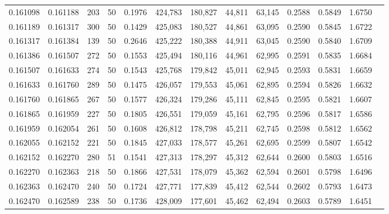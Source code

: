 \begin{tabular}{rrrrrrrrrrrrr}
0.161098 & 0.161188 &   203 &  50 &                                     0.1976 & 424,783 & 180,827 &  44,811 &  63,145 & 0.2588 & 0.5849 & 1.6750 \\
0.161189 & 0.161317 &   300 &  50 &                                     0.1429 & 425,083 & 180,527 &  44,861 &  63,095 & 0.2590 & 0.5845 & 1.6722 \\
0.161317 & 0.161384 &   139 &  50 &                                     0.2646 & 425,222 & 180,388 &  44,911 &  63,045 & 0.2590 & 0.5840 & 1.6709 \\
0.161386 & 0.161507 &   272 &  50 &                                     0.1553 & 425,494 & 180,116 &  44,961 &  62,995 & 0.2591 & 0.5835 & 1.6684 \\
0.161507 & 0.161633 &   274 &  50 &                                     0.1543 & 425,768 & 179,842 &  45,011 &  62,945 & 0.2593 & 0.5831 & 1.6659 \\
0.161633 & 0.161760 &   289 &  50 &                                     0.1475 & 426,057 & 179,553 &  45,061 &  62,895 & 0.2594 & 0.5826 & 1.6632 \\
0.161760 & 0.161865 &   267 &  50 &                                     0.1577 & 426,324 & 179,286 &  45,111 &  62,845 & 0.2595 & 0.5821 & 1.6607 \\
0.161865 & 0.161959 &   227 &  50 &                                     0.1805 & 426,551 & 179,059 &  45,161 &  62,795 & 0.2596 & 0.5817 & 1.6586 \\
0.161959 & 0.162054 &   261 &  50 &                                     0.1608 & 426,812 & 178,798 &  45,211 &  62,745 & 0.2598 & 0.5812 & 1.6562 \\
0.162055 & 0.162152 &   221 &  50 &                                     0.1845 & 427,033 & 178,577 &  45,261 &  62,695 & 0.2599 & 0.5807 & 1.6542 \\
0.162152 & 0.162270 &   280 &  51 &                                     0.1541 & 427,313 & 178,297 &  45,312 &  62,644 & 0.2600 & 0.5803 & 1.6516 \\
0.162270 & 0.162363 &   218 &  50 &                                     0.1866 & 427,531 & 178,079 &  45,362 &  62,594 & 0.2601 & 0.5798 & 1.6496 \\
0.162363 & 0.162470 &   240 &  50 &                                     0.1724 & 427,771 & 177,839 &  45,412 &  62,544 & 0.2602 & 0.5793 & 1.6473 \\
0.162470 & 0.162589 &   238 &  50 &                                     0.1736 & 428,009 & 177,601 &  45,462 &  62,494 & 0.2603 & 0.5789 & 1.6451 \\

\end{tabular}
